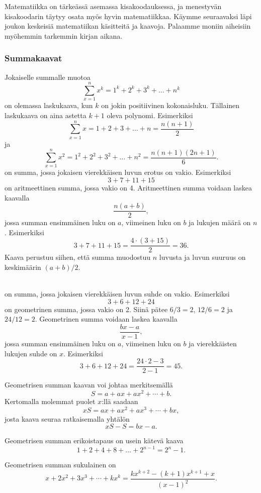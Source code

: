 Matematiikka on tärkeässä asemassa kisakoodauksessa,
ja menestyvän kisakoodarin täytyy osata myös
hyvin matematiikkaa.
Käymme seuraavaksi läpi joukon keskeisiä
matematiikan käsitteitä ja kaavoja.
Palaamme moniin aiheisiin myöhemmin tarkemmin kirjan aikana.

\subsubsection{Summakaavat}

Jokaiselle summalle muotoa
\[\sum_{x=1}^n x^k = 1^k+2^k+3^k+\ldots+n^k\]
on olemassa laskukaava,
kun $k$ on jokin positiivinen kokonaisluku.
Tällainen laskukaava on aina astetta $k+1$
oleva polynomi. Esimerkiksi
\[\sum_{x=1}^n x = 1+2+3+\ldots+n = \frac{n(n+1)}{2}\]
ja
\[\sum_{x=1}^n x^2 = 1^2+2^2+3^2+\ldots+n^2 = \frac{n(n+1)(2n+1)}{6}.\]
\noindent
{} on summa, 
jossa jokaisen vierekkäisen luvun erotus on vakio.
Esimerkiksi
\[3+7+11+15\]
on aritmeettinen summa,
jossa vakio on 4.
Aritmeettinen summa voidaan laskea kaavalla
\[\frac{n(a+b)}{2},\]
jossa summan ensimmäinen luku on $a$,
viimeinen luku on $b$ ja lukujen määrä on $n$.
Esimerkiksi
\[3+7+11+15=\frac{4 \cdot (3+15)}{2} = 36.\]
Kaava perustuu siihen, että summa muodostuu $n$ luvusta
ja luvun suuruus on keskimäärin $(a+b)/2$.

~\\
\noindent
{} on summa,
jossa jokaisen vierekkäisen luvun suhde on vakio.
Esimerkiksi
\[3+6+12+24\]
on geometrinen summa,
jossa vakio on 2.
Siinä pätee $6/3=2$, $12/6=2$ ja $24/12=2$.
Geometrinen summa voidaan laskea kaavalla
\[\frac{bx-a}{x-1},\]
jossa summan ensimmäinen luku on $a$,
viimeinen luku on $b$ ja vierekkäisten lukujen suhde on $x$.
Esimerkiksi
\[3+6+12+24=\frac{24 \cdot 2 - 3}{2-1} = 45.\]

Geometrisen summan kaavan voi johtaa merkitsemällä
\[ S = a + ax + ax^2 + \cdots + b .\] 
Kertomalla molemmat puolet $x$:llä saadaan
\[ xS = ax + ax^2 + ax^3 + \cdots + bx,\]
josta kaava seuraa ratkaisemalla yhtälön
\[ xS-S = bx-a.\]

Geometrisen summan erikoistapaus on usein kätevä kaava
\[1+2+4+8+\ldots+2^{n-1}=2^n-1.\]

Geometrisen summan sukulainen on
\[x+2x^2+3x^3+\cdots+k x^k = \frac{kx^{k+2}-(k+1)x^{k+1}+x}{(x-1)^2}. \]


